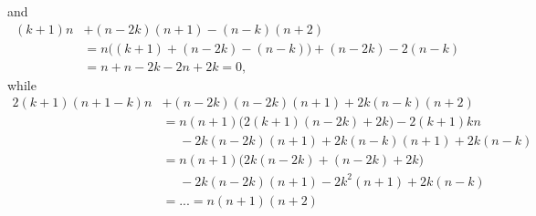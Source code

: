 and
\begin{align*}
  (k+1)n&+(n-2k)(n+1)-(n-k)(n+2) \\
        &= n\bigl( (k+1)+(n-2k) - (n-k) \bigr) + (n-2k) - 2(n-k)\\
  &= n + n-2k -2n+2k = 0,
\end{align*}
while
\begin{align*}
  2(k+1)(n+1-k)n& + (n-2k)(n-2k)(n+1)+2k(n-k)(n+2) \\
                &= n(n+1)\bigl( 2(k+1) (n-2k) + 2k \bigr) - 2(k+1)kn \\
                &\phantom{{}={}}{} - 2k(n-2k)(n+1) + 2k(n-k)(n+1)+2k(n-k) \\
                &= n(n+1)\bigl(2k(n-2k)+(n-2k)+2k) \\
                &\phantom{{}={}}{} - 2k(n-2k)(n+1)-2k^2(n+1)+2k(n-k) \\
  &= ... = n(n+1)(n+2)
\end{align*}

